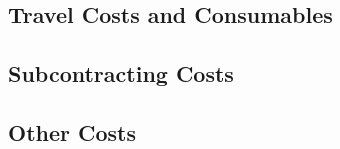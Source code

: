 \subsection{Travel Costs and Consumables}\label{sec:travel-costs}
\subsection{Subcontracting Costs}


\subsection{Other Costs}


